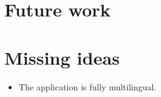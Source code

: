 \documentclass{sig-alternate-05-2015}
\begin{document}
\section{Future work}

{\color{red}
\section{Missing ideas}
\begin{itemize}
\item The application is fully multilingual.
\end{itemize}

}


{}

\nocite{*}
\end{document}
